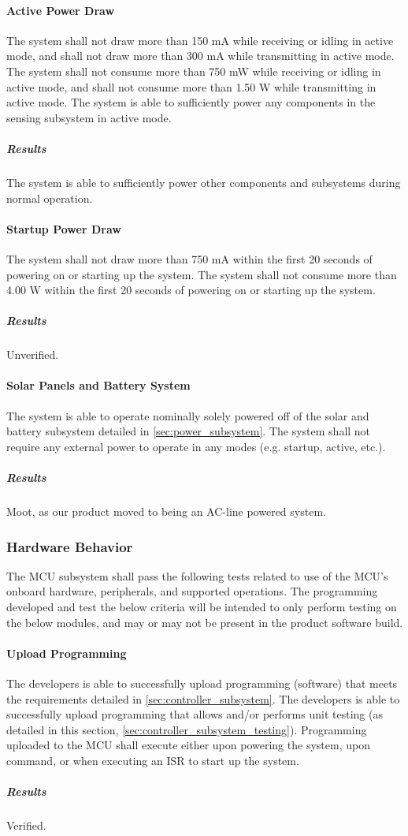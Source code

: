 \paragraph{Active Power Draw} The system shall not draw more than 150 mA while
receiving or idling in active mode, and shall not draw more than 300
mA while transmitting in active mode. The system shall not consume more
than 750 mW while receiving or idling in active mode, and shall not
consume more than 1.50 W while transmitting in active mode. The system
is able to sufficiently power any components in the sensing subsystem in
active mode.
\subparagraph{Results} The system is able to sufficiently power other components and subsystems during normal operation.

\paragraph{Startup Power Draw} The system shall not draw more than 750 mA
within the first 20 seconds of powering on or starting up the system. The
system shall not consume more than 4.00 W within the first 20 seconds of
powering on or starting up the system.
\subparagraph{Results} Unverified.

\paragraph{Solar Panels and Battery System} The system is able to
operate nominally solely powered off of the solar and battery subsystem
detailed in \autoref{sec:power_subsystem}. The system shall not require any
external power to operate in any modes (e.g. startup, active, etc.).
\subparagraph{Results} Moot, as our product moved to being an AC-line powered system.

\subsubsection{Hardware Behavior}
The MCU subsystem shall pass the following tests related to use of the
MCU's onboard hardware, peripherals, and supported operations. The
programming developed and test the below criteria will be intended to only
perform testing on the below modules, and may or may not be present in the
product software build.

\paragraph{Upload Programming} The developers is able to successfully
upload programming (software) that meets the requirements detailed in
\autoref{sec:controller_subsystem}. The developers is able to
successfully upload programming that allows and/or performs unit testing
(as detailed in this section, \autoref{sec:controller_subsystem_testing}).
Programming uploaded to the MCU shall execute either upon powering the
system, upon command, or when executing an ISR to start up the system.
\subparagraph{Results} Verified.

